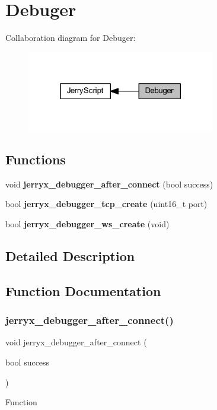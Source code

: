 \section{Debuger}
\label{group___debuger}
Collaboration diagram for Debuger\+:\nopagebreak
\begin{figure}[H]
\begin{center}
\leavevmode
\includegraphics[width=232pt]{group___debuger}
\end{center}
\end{figure}
\subsection*{Functions}
\begin{DoxyCompactItemize}
\item 
void \textbf{ jerryx\+\_\+debugger\+\_\+after\+\_\+connect} (bool success)
\item 
\mbox{\label{group___debuger_ga98dcfa19d685f7910971b18ec1796adb}} 
bool {\bfseries jerryx\+\_\+debugger\+\_\+tcp\+\_\+create} (uint16\+\_\+t port)
\item 
\mbox{\label{group___debuger_ga062084ccde29b87c1b0820a5bb63ab9e}} 
bool {\bfseries jerryx\+\_\+debugger\+\_\+ws\+\_\+create} (void)
\end{DoxyCompactItemize}


\subsection{Detailed Description}


\subsection{Function Documentation}
\mbox{\label{group___debuger_ga6ef3f9c3a4379e9500b7801defb1d624}} 
\subsubsection{jerryx\_debugger\_after\_connect()}
{\footnotesize\ttfamily void jerryx\+\_\+debugger\+\_\+after\+\_\+connect (\begin{DoxyParamCaption}\item[{bool}]{success }\end{DoxyParamCaption})}

Function 